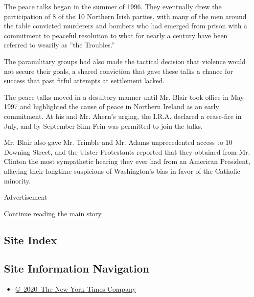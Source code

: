 The peace talks began in the summer of 1996. They eventually drew the
participation of 8 of the 10 Northern Irish parties, with many of the
men around the table convicted murderers and bombers who had emerged
from prison with a commitment to peaceful resolution to what for nearly
a century have been referred to wearily as ''the Troubles.''

The paramilitary groups had also made the tactical decision that
violence would not secure their goals, a shared conviction that gave
these talks a chance for success that past fitful attempts at settlement
lacked.

The peace talks moved in a desultory manner until Mr. Blair took office
in May 1997 and highlighted the cause of peace in Northern Ireland as an
early commitment. At his and Mr. Ahern's urging, the I.R.A. declared a
cease-fire in July, and by September Sinn Fein was permitted to join the
talks.

Mr. Blair also gave Mr. Trimble and Mr. Adams unprecedented access to 10
Downing Street, and the Ulster Protestants reported that they obtained
from Mr. Clinton the most sympathetic hearing they ever had from an
American President, allaying their longtime suspicions of Washington's
bias in favor of the Catholic minority.

Advertisement

\protect\hyperlink{after-bottom}{Continue reading the main story}

\hypertarget{site-index}{%
\subsection{Site Index}\label{site-index}}

\hypertarget{site-information-navigation}{%
\subsection{Site Information
Navigation}\label{site-information-navigation}}

\begin{itemize}
\tightlist
\item
  \href{https://help.nytimes.com/hc/en-us/articles/115014792127-Copyright-notice}{©~2020~The
  New York Times Company}
\end{itemize}

